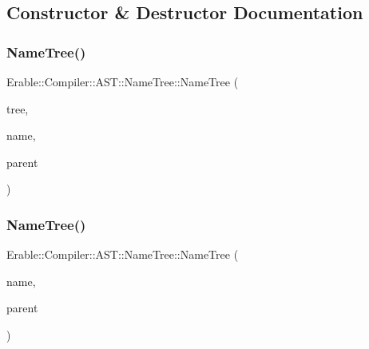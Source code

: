 \subsection{Constructor \& Destructor Documentation}
\mbox{\label{class_erable_1_1_compiler_1_1_a_s_t_1_1_name_tree_add1cf1c00ef6b7149c7ba063b899789c}} 
\subsubsection{\texorpdfstring{NameTree()}{NameTree()}\hspace{0.1cm}{\footnotesize\ttfamily [1/2]}}
{\footnotesize\ttfamily Erable\+::\+Compiler\+::\+A\+S\+T\+::\+Name\+Tree\+::\+Name\+Tree (\begin{DoxyParamCaption}\item[{std\+::vector$<$ \mbox{\hyperlink{class_erable_1_1_compiler_1_1_a_s_t_1_1_name_tree}{Name\+Tree}} $\ast$ $>$}]{tree,  }\item[{\mbox{\hyperlink{class_erable_1_1_compiler_1_1_a_s_t_1_1_name}{Name}}}]{name,  }\item[{\mbox{\hyperlink{class_erable_1_1_compiler_1_1_a_s_t_1_1_name_tree}{Name\+Tree}} $\ast$}]{parent }\end{DoxyParamCaption})}

\mbox{\label{class_erable_1_1_compiler_1_1_a_s_t_1_1_name_tree_af3c6d604abaaff8fd09189a8819e0e0a}} 
\subsubsection{\texorpdfstring{NameTree()}{NameTree()}\hspace{0.1cm}{\footnotesize\ttfamily [2/2]}}
{\footnotesize\ttfamily Erable\+::\+Compiler\+::\+A\+S\+T\+::\+Name\+Tree\+::\+Name\+Tree (\begin{DoxyParamCaption}\item[{\mbox{\hyperlink{class_erable_1_1_compiler_1_1_a_s_t_1_1_name}{Name}}}]{name,  }\item[{\mbox{\hyperlink{class_erable_1_1_compiler_1_1_a_s_t_1_1_name_tree}{Name\+Tree}} $\ast$}]{parent }\end{DoxyParamCaption})}



